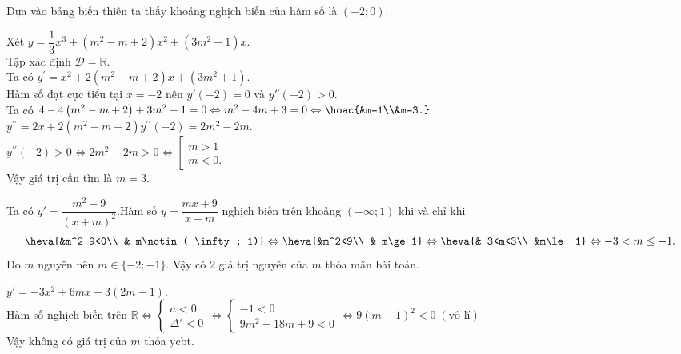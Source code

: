 \begin{Solbook}{1}
 \par \noindent  Dựa vào bảng biến thiên ta thấy khoảng nghịch biến của hàm số là $(-2;0)$.  \par \noindent \selectC \hfill \qedEX 
\end{Solbook}
\begin{Solbook}{2}
 \par \noindent  Xét $y=\dfrac {1}{3} x^{3}+\left (m^{2}-m+2\right ) x^{2}+\left (3 m^{2}+1\right ) x$.\\ Tập xác định $\mathscr D=\mathbb {R}$.\\ Ta có $y^{\prime }=x^{2}+2\left (m^{2}-m+2\right ) x+\left (3 m^{2}+1\right )$.\\ Hàm số đạt cực tiểu tại $x=-2$ nên $y'(-2)=0$ và $y''(-2)>0$.\\ Ta có $4-4\left (m^{2}-m+2\right )+3 m^{2}+1=0 \Leftrightarrow m^{2}-4 m+3=0\Leftrightarrow \hoac {&m=1\\&m=3.}$\\ $y^{\prime \prime }=2 x+2\left (m^{2}-m+2\right )$$y^{\prime \prime }(-2)=2 m^{2}-2 m$.\\ $y^{\prime \prime }(-2)>0 \Leftrightarrow 2 m^{2}-2 m>0 \Leftrightarrow \left [\begin {array}{l}m>1 \\ m<0.\end {array}\right .$\\ Vậy giá trị cần tìm là $m=3$.  \par \noindent \selectB \hfill \qedEX 
\end{Solbook}
\begin{Solbook}{3}
 \par \noindent  Ta có $y'= \dfrac {m^2-9}{(x+m)^2}$.Hàm số $y=\dfrac {mx+9}{x+m}$ nghịch biến trên khoảng $(-\infty ; 1)$ khi và chỉ khi \[ \heva {&m^2-9<0\\ &-m\notin (-\infty ; 1)} \Leftrightarrow \heva {&m^2<9\\ &-m\ge 1} \Leftrightarrow \heva {&-3<m<3\\ &m\le -1} \Leftrightarrow -3<m\le -1. \] Do $m$ nguyên nên $m\in \{-2; -1\}$. Vậy có $2$ giá trị nguyên của $m$ thỏa mãn bài toán.  \par \noindent \selectB \hfill \qedEX 
\end{Solbook}
\begin{Solbook}{4}
 \par \noindent $y'=-3x^2+6mx-3(2m-1)$. \\Hàm số nghịch biến trên $\mathbb {R} \Leftrightarrow \begin {cases} a<0 \\ \Delta ' <0 \end {cases} \Leftrightarrow \begin {cases} -1<0 \\ 9m^2-18m+9 <0 \end {cases} \Leftrightarrow 9(m-1)^2<0 \; (\text {vô lí}) $\\ Vậy không có giá trị của $m$ thỏa ycbt. \par \noindent \selectC \hfill \qedEX 
\end{Solbook}

